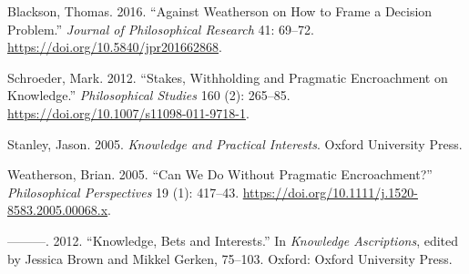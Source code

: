 \documentclass[
  11pt,
  letterpaper,
  DIV=11,
  numbers=noendperiod]{scrartcl}
\newlength{\cslhangindent}
\newenvironment{CSLReferences}[2] %
 {\begin{list}{}{%
  \setlength{\itemindent}{0pt}
  \setlength{\leftmargin}{0pt}
  \setlength{\parsep}{0pt}
  \ifodd #1
   \setlength{\leftmargin}{\cslhangindent}
   \setlength{\itemindent}{-1\cslhangindent}
  \fi
  \setlength{\itemsep}{#2\baselineskip}}}
 {\end{list}}
\begin{document}
\label{refs}
\begin{CSLReferences}{1}{0}
Blackson, Thomas. 2016. {``Against Weatherson on How to Frame a Decision
Problem.''} \emph{Journal of Philosophical Research} 41: 69--72.
\url{https://doi.org/10.5840/jpr201662868}.

Schroeder, Mark. 2012. {``Stakes, Withholding and Pragmatic Encroachment
on Knowledge.''} \emph{Philosophical Studies} 160 (2): 265--85.
\url{https://doi.org/10.1007/s11098-011-9718-1}.

Stanley, Jason. 2005. \emph{{Knowledge and Practical Interests}}. Oxford
University Press.

Weatherson, Brian. 2005. {``{Can We Do Without Pragmatic
Encroachment?}''} \emph{Philosophical Perspectives} 19 (1): 417--43.
\url{https://doi.org/10.1111/j.1520-8583.2005.00068.x}.

---------. 2012. {``Knowledge, Bets and Interests.''} In \emph{Knowledge
Ascriptions}, edited by Jessica Brown and Mikkel Gerken, 75--103.
Oxford: Oxford University Press.

\end{CSLReferences}
\end{document}
